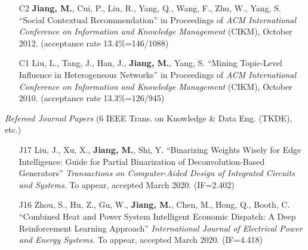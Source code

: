 \documentclass[10pt]{article}
\newenvironment{myindentpar}[1]%
{\begin{list}{}%
         {\setlength{\leftmargin}{#1}}%
         \item[]%
}
{\end{list}}
\newcounter{list}
\newcommand{\hide}[1]{}
\begin{document}
\begin{myindentpar}{0.00cm}
\begin{enumerate}[leftmargin=.5cm]
	\hide{\vspace{-0.1cm}\hspace{0.5cm}{\small \emph{I conceived the idea in consultation with Dr. Wang. I designed the study, completed the experiments, and wrote the paper. Dr. Cui edited the paper.}}}

\item[C2] \textbf{Jiang, M.}, Cui, P., Liu, R., Yang, Q., Wang, F., Zhu, W., Yang, S. ``Social Contextual Recommendation'' in Proceedings of \emph{ACM International Conference on Information and Knowledge Management} (CIKM), October 2012. (acceptance rate 13.4\%=146/1088)

	\hide{\vspace{-0.1cm}\hspace{0.5cm}{\small \emph{I conceived the idea in consultation with Dr. Cui. I designed the study, completed the experiments, and wrote the paper. Dr. Cui edited the paper.}}}

\item[C1] Liu, L., Tang, J., Han, J., \textbf{Jiang, M.}, Yang, S. ``Mining Topic-Level Influence in Heterogeneous Networks'' in Proceedings of \emph{ACM International Conference on Information and Knowledge Management} (CIKM), October 2010. (acceptance rate 13.3\%=126/945)

	\hide{\vspace{-0.1cm}\hspace{0.5cm}{\small \emph{Ms. Liu conceived the idea in consultation with myself. Ms. Liu and I implemented the system and completed the experiments.}}}

\end{enumerate}

\hspace{-0.25cm}\emph{Refereed Journal Papers} {\small (6 IEEE Trans. on Knowledge \& Data Eng. (TKDE), etc.)}

\begin{enumerate}[leftmargin=.5cm]

\item[J17] Liu, J., Xu, X., \textbf{Jiang, M.}, Shi, Y. ``Binarizing Weights Wisely for Edge Intelligence: Guide for Partial Binarization of Deconvolution-Based Generators'' \textit{Transactions on Computer-Aided Design of Integrated Circuits and Systems}. To appear, accepted March 2020. (IF=2.402)

\item[J16] Zhou, S., Hu, Z., Gu, W., \textbf{Jiang, M.}, Chen, M., Hong, Q., Booth, C. ``Combined Heat and Power System Intelligent Economic Dispatch: A Deep Reinforcement Learning Approach'' \textit{International Journal of Electrical Power and Energy Systems}. To appear, accepted March 2020. (IF=4.418)


\end{enumerate}
\end{myindentpar}
\end{document}
